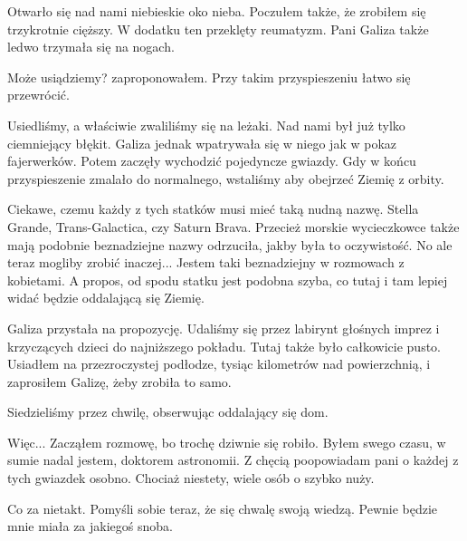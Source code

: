 Otwarło się nad nami niebieskie oko nieba.
Poczułem także, że zrobiłem się trzykrotnie cięższy.
W dodatku ten przeklęty reumatyzm.
Pani Galiza także ledwo trzymała się na nogach.

\begin{dialogue}
	\ds{} Może usiądziemy? \dm{} zaproponowałem. \dm{} Przy takim przyspieszeniu łatwo się przewrócić.
\end{dialogue}

Usiedliśmy, a właściwie zwaliliśmy się na leżaki.
Nad nami był już tylko ciemniejący błękit.
Galiza jednak wpatrywała się w niego jak w pokaz fajerwerków.
Potem zaczęły wychodzić pojedyncze gwiazdy.
Gdy w końcu przyspieszenie zmalało do normalnego, wstaliśmy aby obejrzeć Ziemię z orbity.

\begin{dialogue}
	\ds{} Ciekawe, czemu każdy z tych statków musi mieć taką nudną nazwę. Stella Grande, Trans-Galactica, czy Saturn Brava.
	\ds{} Przecież morskie wycieczkowce także mają podobnie beznadziejne nazwy \dm{} odrzuciła, jakby była to oczywistość.
	\ds{} No ale teraz mogliby zrobić inaczej... \dm{} Jestem taki beznadziejny w rozmowach z kobietami. \dm{} 
			A propos, od spodu statku jest podobna szyba, co tutaj i tam lepiej widać będzie oddalającą się Ziemię.
\end{dialogue}

Galiza przystała na propozycję.
Udaliśmy się przez labirynt głośnych imprez i krzyczących dzieci do najniższego pokładu.
Tutaj także było całkowicie pusto.
Usiadłem na przezroczystej podłodze, tysiąc kilometrów nad powierzchnią, i zaprosiłem Galizę, żeby zrobiła to samo.

Siedzieliśmy przez chwilę, obserwując oddalający się dom.

\begin{dialogue}
	\ds{} Więc... \dm{} Zacząłem rozmowę, bo trochę dziwnie się robiło. \dm{} Byłem swego czasu, w sumie nadal jestem, doktorem astronomii.
		Z chęcią poopowiadam pani o każdej z tych gwiazdek osobno. Chociaż niestety, wiele osób o szybko nuży.
\end{dialogue}

Co za nietakt. Pomyśli sobie teraz, że się chwalę swoją wiedzą.
Pewnie będzie mnie miała za jakiegoś snoba.

